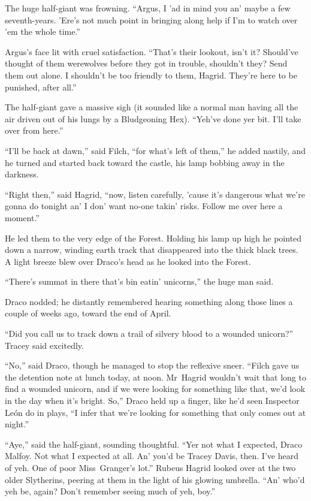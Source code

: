 The huge half-giant was frowning. “Argus, I ’ad in mind you an’ maybe a few seventh-years. ’Ere’s not much point in bringing along help if I’m to watch over ’em the whole time.”

Argus’s face lit with cruel satisfaction. “That’s their lookout, isn’t it? Should’ve thought of them werewolves before they got in trouble, shouldn’t they? Send them out alone. I shouldn’t be too friendly to them, Hagrid. They’re here to be punished, after all.”

The half-giant gave a massive sigh (it sounded like a normal man having all the air driven out of his lungs by a Bludgeoning Hex). “Yeh’ve done yer bit. I’ll take over from here.”

“I’ll be back at dawn,” said Filch, “for what’s left of them,” he added nastily, and he turned and started back toward the castle, his lamp bobbing away in the darkness.

“Right then,” said Hagrid, “now, listen carefully, ’cause it’s dangerous what we’re gonna do tonight an’ I don’ want no-one takin’ risks. Follow me over here a moment.”

He led them to the very edge of the Forest. Holding his lamp up high he pointed down a narrow, winding earth track that disappeared into the thick black trees. A light breeze blew over Draco’s head as he looked into the Forest.

“There’s summat in there that’s bin eatin’ unicorns,” the huge man said.

Draco nodded; he distantly remembered hearing something along those lines a couple of weeks ago, toward the end of April.

“Did you call us to track down a trail of silvery blood to a wounded unicorn?” Tracey said excitedly.

“No,” said Draco, though he managed to stop the reflexive sneer. “Filch gave us the detention note at lunch today, at noon. Mr~Hagrid wouldn’t wait that long to find a wounded unicorn, and if we were looking for something like that, we’d look in the day when it’s bright. So,” Draco held up a finger, like he’d seen Inspector León do in plays, “I infer that we’re looking for something that only comes out at night.”

“Aye,” said the half-giant, sounding thoughtful. “Yer not what I expected, Draco Malfoy. Not what I expected at all. An’ you’d be Tracey Davis, then. I’ve heard of yeh. One of poor Miss~Granger’s lot.” Rubeus Hagrid looked over at the two older Slytherins, peering at them in the light of his glowing umbrella. “An’ who’d yeh be, again? Don’t remember seeing much of yeh, boy.”

